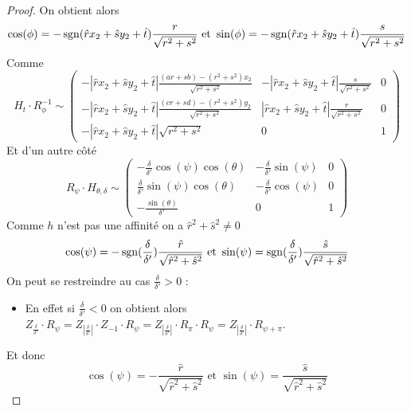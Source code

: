 \begin{proof}
 On obtient alors 
 \begin{equation*}
 \cos( \phi )= -\operatorname{sgn}(\hat r x_2 +\hat s y_2 +\hat t) \frac{r}{\sqrt{r^2 + s^2}} \text{ et } \sin( \phi )= -\operatorname{sgn}(\hat r x_2 +\hat s y_2 +\hat t) \frac{s}{\sqrt{r^2 + s^2}}
 \end{equation*}
 Comme 
 \begin{equation*}
H_t \cdot R_{\phi}^{-1} \sim
 \begin{pmatrix}
 -|\hat r x_2 +\hat s y_2 +\hat t|\frac{(ar+sb)-(r^2 + s^2)x_2}{\sqrt{r^2 + s^2}}&-|\hat r x_2 +\hat s y_2 +\hat t|\frac{\hat s}{\sqrt{r^2 + s^2}}&0\\
 -|\hat r x_2 +\hat s y_2 +\hat t|\frac{(cr+sd)-(r^2 + s^2)y_2}{\sqrt{r^2 + s^2}}&|\hat r x_2 +\hat s y_2 +\hat t|\frac{r}{\sqrt{r^2 + s^2}}&0\\
 -|\hat r x_2 +\hat s y_2 +\hat t|\sqrt{r^2 + s^2}&0&1
 \end{pmatrix}
 \end{equation*}
 Et d'un autre côté 
 \begin{equation*}
R_{\psi} \cdot H_{\theta,\delta}  \sim 
 \begin{pmatrix}
 -\frac{\delta}{\delta'}\cos(\psi)\cos(\theta)&
-\frac{\delta}{\delta'}\sin(\psi)&
0\\
\frac{\delta}{\delta'}\sin(\psi)\cos(\theta)&
-\frac{\delta}{\delta'}\cos(\psi)&
0\\
-\frac{\sin(\theta)}{\delta'}&
0&
1
 \end{pmatrix}
 \end{equation*}
Comme $h$ n'est pas une affinité on a $\hat r^2 + \hat s^2 \ne 0$ 
 \begin{equation*}
  \cos( \psi ) =- \operatorname{sgn}(\frac{\delta}{\delta'})\frac{\hat r}{\sqrt{\hat r^2 + \hat s^2}}\text{ et } \sin( \psi ) = \operatorname{sgn}(\frac{\delta}{\delta'})\frac{\hat s}{\sqrt{\hat r^2 + \hat s^2}}
 \end{equation*}
On peut se restreindre au cas $\frac{\delta}{\delta'}>0$ :\\
\begin{itemize}
\item En effet si $\frac{\delta}{\delta'}<0$ on obtient alors $Z_{\frac{\delta}{\delta'}} \cdot R_{\psi}=Z_{\left|\frac{\delta}{\delta'}\right|}\cdot Z_{-1} \cdot R_{\psi}=Z_{\left|\frac{\delta}{\delta'}\right|}\cdot R_{\pi} \cdot R_{\psi}=Z_{\left|\frac{\delta}{\delta'}\right|}\cdot R_{\psi+\pi}$.
\end{itemize}
Et donc 
 \begin{equation*}
  \cos( \psi ) =- \frac{\hat r}{\sqrt{\hat r^2 + \hat s^2}} \text{ et } \sin( \psi ) = \frac{\hat s}{\sqrt{\hat r^2 + \hat s^2}}
 \end{equation*}




\end{proof}
